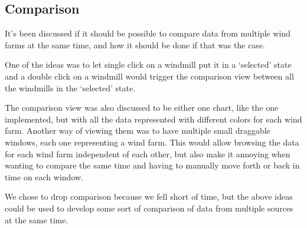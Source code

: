 \subsection{Comparison}
It's been discussed if it should be possible to compare data from multiple wind farms at the same time, and how it should be done if that was the case.

One of the ideas was to let single click on a windmill put it in a `selected' state and a double click on a windmill would trigger the comparison view between all the windmills in the `selected' state.

The comparison view was also discussed to be either one chart, like the one implemented, but with all the data represented with different colors for each wind farm.
Another way of viewing them was to have multiple small draggable windows, each one representing a wind farm. This would allow browsing the data for each wind farm independent of each other, but also make it annoying when wanting to compare the same time and having to manually move forth or back in time on each window.

We chose to drop comparison because we fell short of time, but the above ideas could be used to develop some sort of comparison of data from multiple sources at the same time.
